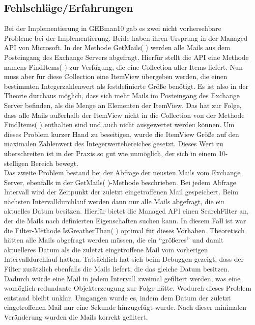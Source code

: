 \subsection{Fehlschläge/Erfahrungen}
\noindent
Bei der Implementierung in GEBman10 gab es zwei nicht vorhersehbare Probleme bei der Implementierung. Beide haben ihren Ursprung in der Managed API von Microsoft. In der Methode GetMails( ) werden alle Mails aus dem Posteingang des Exchange Servers abgefragt. Hierfür stellt die API eine Methode namens FindItems( ) zur Verfügung, die eine Collection aller Items liefert. Nun muss aber für diese Collection eine ItemView übergeben werden, die einen bestimmten Integerzahlenwert als festdefinierte Größe benötigt. Es ist also in der Theorie durchaus möglich, dass sich mehr Mails im Posteingang des Exchange Server befinden, als die Menge an Elementen der ItemView. Das hat zur Folge, dass alle Mails außerhalb der ItemView nicht in die Collection von der Methode FindItems( ) enthalten sind und auch nicht ausgewertet werden können. Um dieses Problem kurzer Hand zu beseitigen, wurde die ItemView Größe auf den maximalen Zahlenwert des Integerwertebereiches gesetzt. Dieses Wert zu überschreiten ist in der Praxis so gut wie unmöglich, der sich in einem 10-stelligen Bereich bewegt.\\

\noindent
Das zweite Problem bestand bei der Abfrage der neusten Mails vom Exchange Server, ebenfalls in der GetMails( )-Methode beschrieben. Bei jedem Abfrage Intervall wird der Zeitpunkt der zuletzt eingetroffenen Mail gespeichert. Beim nächsten Intervalldurchlauf werden dann nur alle Mails abgefragt, die ein aktuelles Datum besitzen. Hierfür bietet die Managed API einen SearchFilter an, der die Mails nach definierten Eigenschaften suchen kann. In diesem Fall ist war die Filter-Methode IsGreatherThan( ) optimal für dieses Vorhaben. Theoretisch hätten alle Mails abgefragt werden müssen, die ein \enquote{größeres} und damit aktuelleres Datum als die zuletzt eingetroffene Mail vom vorherigen Intervalldurchlauf hatten. Tatsächlich hat sich beim Debuggen gezeigt, dass der Filter zusätzlich ebenfalls die Mails liefert, die das gleiche Datum besitzen. Dadurch würde eine Mail in jedem Intervall zweimal gefiltert werden, was eine womöglich redundante Objekterzeugung zur Folge hätte. Wodurch dieses Problem entstand bleibt unklar. Umgangen wurde es, indem dem Datum der zuletzt eingetroffenen Mail nur eine Sekunde hinzugefügt wurde. Nach dieser minimalen Veränderung wurden die Mails korrekt gefiltert.


